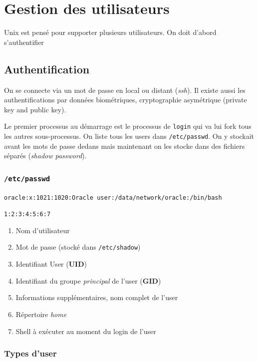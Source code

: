 \section{Gestion des utilisateurs}\label{gestion-des-utilisateurs}

Unix est pensé pour supporter plusieurs utilisateurs. On doit d'abord
s'authentifier

\subsection{Authentification}\label{authentification}

On se connecte via un mot de passe en local ou distant (\emph{ssh}). Il
existe aussi les authentifications par données biométriques,
cryptographie asymétrique (private key and public key).

Le premier processus au démarrage est le processus de \texttt{login} qui
va lui fork tous les autres sous-processus. On liste tous les users dans
\texttt{/etc/passwd}. On y stockait avant les mots de passe dedans mais
maintenant on les stocke dans des fichiers séparés (\emph{shadow
password}).

\subsubsection{\texorpdfstring{\texttt{/etc/passwd}}{/etc/passwd}}\label{etcpasswd}

\texttt{oracle:x:1021:1020:Oracle\ user:/data/network/oracle:/bin/bash}

\texttt{1:2:3:4:5:6:7}

\begin{enumerate}
\def\labelenumi{\arabic{enumi}.}
\tightlist
\item
  Nom d'utilisateur
\item
  Mot de passe (stocké dans \texttt{/etc/shadow})
\item
  Identifiant User (\textbf{UID})
\item
  Identifiant du groupe \emph{principal} de l'user (\textbf{GID})
\item
  Informations supplémentaires, nom complet de l'user
\item
  Répertoire \emph{home}
\item
  Shell à exécuter au moment du login de l'user
\end{enumerate}

\subsubsection{Types d'user}\label{types-duser}

